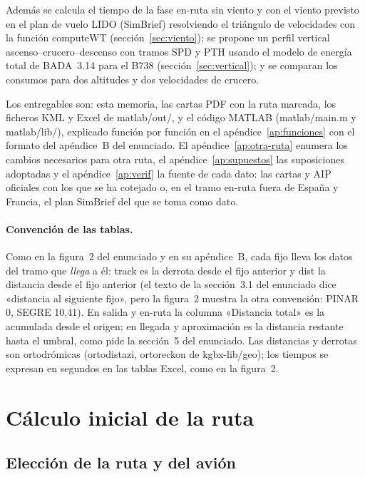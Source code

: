 \documentclass[11pt,a4paper]{article}
\DeclareRobustCommand{\m}[1]{{\ttfamily\def\_{\textunderscore\penalty100\relax}#1}}
\begin{document}
Además se calcula el tiempo de la fase en-ruta sin viento y con el viento previsto en el plan de vuelo LIDO (SimBrief) resolviendo el triángulo de velocidades con la función \m{computeWT} (sección~\ref{sec:viento}); se propone un perfil vertical ascenso--crucero--descenso con tramos SPD y PTH usando el modelo de energía total de BADA~3.14 para el B738 (sección~\ref{sec:vertical}); y se comparan los consumos para dos altitudes y dos velocidades de crucero.

Los entregables son: esta memoria, las cartas PDF con la ruta marcada, los ficheros KML y Excel de \m{matlab/out/}, y el código MATLAB (\m{matlab/main\_*.m} y \m{matlab/lib/}), explicado función por función en el apéndice~\ref{ap:funciones} con el formato del apéndice~B del enunciado. El apéndice~\ref{ap:otra-ruta} enumera los cambios necesarios para otra ruta, el apéndice~\ref{ap:supuestos} las suposiciones adoptadas y el apéndice~\ref{ap:verif} la fuente de cada dato: las cartas y AIP oficiales con los que se ha cotejado o, en el tramo en-ruta fuera de España y Francia, el plan SimBrief del que se toma como dato.

\paragraph{Convención de las tablas.} Como en la figura~2 del enunciado y en su apéndice~B, cada fijo lleva los datos del tramo que \emph{llega} a él: \m{track} es la derrota desde el fijo anterior y \m{dist} la distancia desde el fijo anterior (el texto de la sección~3.1 del enunciado dice «distancia al siguiente fijo», pero la figura~2 muestra la otra convención: PINAR 0, SEGRE 10,41). En salida y en-ruta la columna «Distancia total» es la acumulada desde el origen; en llegada y aproximación es la distancia restante hasta el umbral, como pide la sección~5 del enunciado. Las distancias y derrotas son ortodrómicas (\m{orto\_distazi}, \m{orto\_reckon} de \m{kgbx-lib/geo}); los tiempos se expresan en segundos en las tablas Excel, como en la figura~2.

\section{Cálculo inicial de la ruta}

\subsection{Elección de la ruta y del avión}
\end{document}
